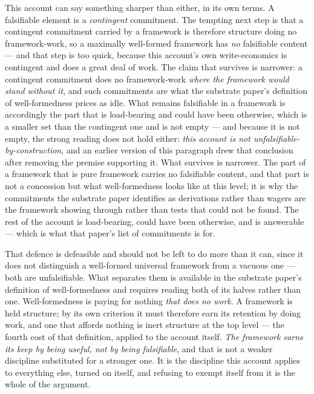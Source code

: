 \documentclass[11pt,a4paper]{article}
\theoremstyle{remark}\newtheorem{remark}[definition]{Remark}
\begin{document}
This account can say something sharper than either, in its own terms. A falsifiable element is a \emph{contingent} commitment. The tempting next step
is that a contingent commitment carried by a framework is therefore structure doing no framework-work,
so a maximally well-formed framework has \emph{no} falsifiable content --- and that step is too quick,
because this account's own write-economics is contingent and does a great deal of work. The claim that
survives is narrower: a contingent commitment does no framework-work \emph{where the framework would
stand without it}, and such commitments are what the substrate paper's definition of well-formedness prices as idle. What
remains falsifiable in a framework is accordingly the part that is load-bearing and could have been
otherwise, which is a smaller set than the contingent one and is not empty --- and because it is not empty, the
strong reading does not hold either: \emph{this account is not unfalsifiable-by-construction}, and an
earlier version of this paragraph drew that conclusion after removing the premise supporting it. What
survives is narrower. The part of a framework that is pure framework carries no falsifiable content,
and that part is not a concession but what well-formedness looks like at this level; it is why the
commitments the substrate paper identifies as derivations rather than wagers are the framework showing through
rather than tests that could not be found. The rest of the account is load-bearing, could have been
otherwise, and is answerable --- which is what that paper's list of commitments is for.

That defence is defeasible and should not be left to do more than it can, since it does not
distinguish a well-formed universal framework from a vacuous one --- both are unfalsifiable. What
separates them is available in the substrate paper's definition of well-formedness and requires reading both of its
halves rather than one. Well-formedness is paying for nothing \emph{that does no work}. A framework is
held structure; by its own criterion it must therefore earn its retention by doing work, and one that
affords nothing is inert structure at the top level --- the fourth cost of that definition, applied to
the account itself. \emph{The framework earns its keep by being useful, not by being falsifiable}, and
that is not a weaker discipline substituted for a stronger one. It is the discipline this account
applies to everything else, turned on itself, and refusing to exempt itself from it is the whole of
the argument.
\end{document}
